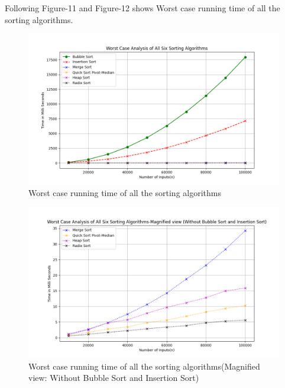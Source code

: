 \documentclass[a4paper,12pt]{report}
\begin{document}
Following Figure-11 and Figure-12 shows Worst case running time of all the sorting algorithms. 
\begin{figure}[H]
	\centering
	\includegraphics[width=1.1\textwidth]{./Worstofall.png}
	\caption{Worst case running time of all the sorting algorithms}
	\label{fig:Worst of all}
\end{figure}

\begin{figure}[H]
	\centering
	\includegraphics[width=1.1\textwidth]{./Worstofallmagnified.png}
	\caption{Worst case running time of all the sorting algorithms(Magnified view: Without Bubble Sort and Insertion Sort)}
	\label{fig:Worst of all Magnified}
\end{figure}
\end{document}
